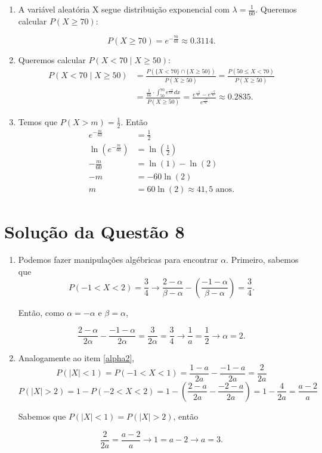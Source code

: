 \documentclass[
	12pt,				%
	openright,			%
	oneside,			%
	a4paper,			%
	english,			%
	brazil,				%
	]{abntex2}
\begin{document}
\begin{enumerate}[label=\alph*)]
    \item A variável aleatória X segue distribuição exponencial com $\lambda = \frac{1}{60}$. Queremos calcular $P(X \geq 70)$:
    
    $$P(X \geq 70) = e^{-\frac{70}{60}} \approx 0.3114.$$

    \item Queremos calcular $P(X < 70 \mid X \geq 50)$:
    \begin{align*}
        P(X < 70 \mid X \geq 50) &= \frac{P(\{X < 70\} \cap \{X \geq 50\})}{P(X \geq 50)} = \frac{P(50 \leq X < 70)}{P(X \geq 50)}\\[1em]
        &= \frac{\frac{1}{60}\cdot \int_{50}^{70} e^{\frac{-x}{60}} dx}{P(X \geq 50)} = \frac{e^{\frac{-5}{6}} - e^\frac{-7}{6}}{e^{\frac{-5}{6}}} \approx 0.2835.
    \end{align*}
    
    \item Temos que $P(X > m) = \frac{1}{2}$. Então
    \begin{align*}
        e^{-\frac{m}{60}} &= \frac{1}{2}\\
        \ln{\left(e^{-\frac{m}{60}}\right)} &= \ln{\left(\frac{1}{2}\right)}\\
        -\frac{m}{60} &= \ln{(1)} - \ln{(2)}\\
        -m &= -60\ln{(2)}\\
        m &= 60\ln{(2)} \approx 41{,}5 \text{ anos.}
    \end{align*}
\end{enumerate}


\section{Solução da Questão 8}


\begin{enumerate}[label=\alph*)]
    \item Podemos fazer manipulações algébricas para encontrar $\alpha$. Primeiro, sabemos que \label{alpha2}
    $$P(-1 < X < 2) = \frac{3}{4} \to \frac{2 - \alpha}{\beta - \alpha} - \left(\frac{-1 - \alpha}{\beta - \alpha}\right) = \frac{3}{4}.$$
    
    Então, como $\alpha = -\alpha$ e $\beta = \alpha$,
    
    $$\frac{2 - \alpha}{2\alpha}-\frac{-1 - \alpha}{2\alpha} = \frac{3}{2\alpha} = \frac{3}{4} \to \frac{1}{a} = \frac{1}{2} \to \alpha = 2.$$

    \item Analogamente ao item \ref{alpha2},
    $$P(|X| < 1) = P(-1 < X < 1) = \frac{1 - a}{2a} - \frac{-1 - a}{2a} = \frac{2}{2a}$$
    $$P(|X| > 2) = 1 - P(-2 < X < 2) = 1 - \left(\frac{2 - a}{2a} - \frac{-2 - a}{2a}\right) = 1 - \frac{4}{2a} = \frac{a - 2}{a}$$
    
    Sabemos que $P(|X| < 1) = P(|X| > 2)$, então
    
    $$\frac{2}{2a} = \frac{a - 2}{a} \to 1 = a - 2 \to a = 3.$$
\end{enumerate}
\end{document}

